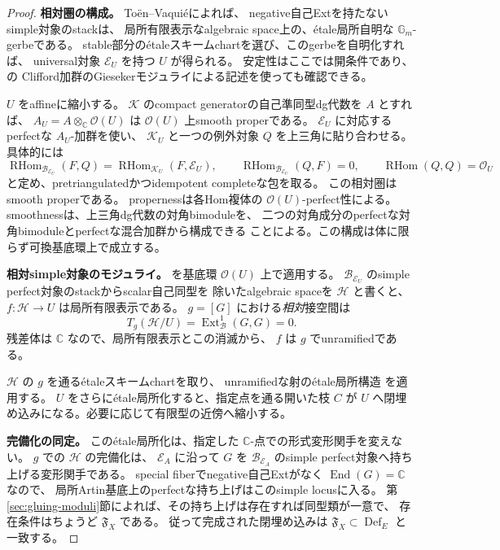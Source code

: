 \documentclass[a4paper,11pt]{ltjsarticle}
\theoremstyle{definition}
\newcommand{\CC}{\mathbb C}
\newcommand{\OO}{\mathcal O}
\newcommand{\Def}{\operatorname{Def}}
\newcommand{\Ext}{\operatorname{Ext}}
\newcommand{\RHom}{\operatorname{RHom}}
\begin{document}
\begin{proof}
\textbf{相対圏の構成。}
To\"en--Vaqui\'e\cite[Corollary 3.22]{TV}によれば、
negative自己Extを持たないsimple対象のstackは、
局所有限表示なalgebraic space上の、\'etale局所自明な
$\mathbb G_m$-gerbeである。
stable部分の\'etaleスキームchartを選び、このgerbeを自明化すれば、
universal対象 $\mathcal E_U$ を持つ $U$ が得られる。
安定性はここでは開条件であり、\cite[Proposition 6.3]{FP}の
Clifford加群のGiesekerモジュライによる記述を使っても確認できる。

$U$ をaffineに縮小する。
$\mathcal K$ のcompact generatorの自己準同型dg代数を $A$ とすれば、
$A_U=A\otimes_\CC\OO(U)$ は $\OO(U)$ 上smooth properである。
$\mathcal E_U$ に対応するperfectな $A_U$-加群を使い、
$\mathcal K_U$ と一つの例外対象 $Q$ を上三角に貼り合わせる。具体的には
\[
 \RHom_{\mathcal B_{\mathcal E_U}}(F,Q)
   =\RHom_{\mathcal K_U}(F,\mathcal E_U),\qquad
 \RHom_{\mathcal B_{\mathcal E_U}}(Q,F)=0,\qquad
 \RHom(Q,Q)=\OO_U
\]
と定め、pretriangulatedかつidempotent completeな包を取る。
この相対圏はsmooth properである。
propernessは各Hom複体の $\OO(U)$-perfect性による。
smoothnessは、上三角dg代数の対角bimoduleを、
二つの対角成分のperfectな対角bimoduleとperfectな混合加群から構成できる
ことによる。この構成は体に限らず可換基底環上で成立する。

\textbf{相対simple対象のモジュライ。}
\cite[Corollaries 2.13, 3.15, 3.17, 3.22]{TV}を基底環 $\OO(U)$ 上で適用する。
$\mathcal B_{\mathcal E_U}$ のsimple perfect対象のstackからscalar自己同型を
除いたalgebraic spaceを $\mathcal H$ と書くと、
$f:\mathcal H\to U$ は局所有限表示である。
$g=[G]$ における\emph{相対}接空間は
\[
 T_g(\mathcal H/U)=\Ext^1_{\mathcal B}(G,G)=0.
\]
残差体は $\CC$ なので、局所有限表示とこの消滅から、
$f$ は $g$ でunramifiedである。

$\mathcal H$ の $g$ を通る\'etaleスキームchartを取り、
unramifiedな射の\'etale局所構造
\cite[Lemma 41.17.1, Tag 04HH]{StacksUnramified}を適用する。
$U$ をさらに\'etale局所化すると、指定点を通る開いた枝 $C$ が
$U$ へ閉埋め込みになる。必要に応じて有限型の近傍へ縮小する。

\textbf{完備化の同定。}
この\'etale局所化は、指定した $\CC$-点での形式変形関手を変えない。
$g$ での $\mathcal H$ の完備化は、
$\mathcal E_A$ に沿って $G$ を
$\mathcal B_{\mathcal E_A}$ のsimple perfect対象へ持ち上げる変形関手である。
special fiberでnegative自己Extがなく $\operatorname{End}(G)=\CC$ なので、
局所Artin基底上のperfectな持ち上げはこのsimple locusに入る。
第\ref{sec:gluing-moduli}節によれば、その持ち上げは存在すれば同型類が一意で、
存在条件はちょうど $\mathfrak F_X$ である。
従って完成された閉埋め込みは
$\mathfrak F_X\subset\Def_E$ と一致する。
\end{proof}
\end{document}
